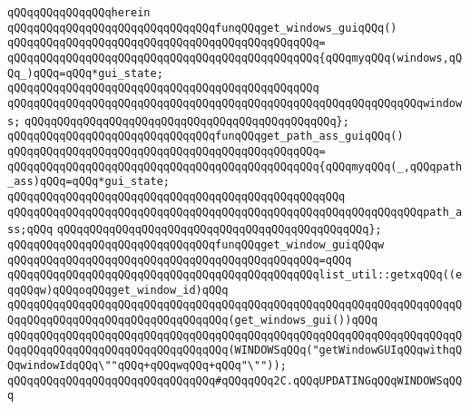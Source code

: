 \verb|qQQqqQQqqQQqqQQqherein|\newline
\newline
\verb|qQQqqQQqqQQqqQQqqQQqqQQqqQQqqQQqfunqQQqget_windows_guiqQQq()|\newline
\verb|qQQqqQQqqQQqqQQqqQQqqQQqqQQqqQQqqQQqqQQqqQQqqQQq=|\newline
\verb|qQQqqQQqqQQqqQQqqQQqqQQqqQQqqQQqqQQqqQQqqQQqqQQq{qQQqmyqQQq(windows,qQQq_)qQQq=qQQq*gui_state;|\newline
\verb|qQQqqQQqqQQqqQQqqQQqqQQqqQQqqQQqqQQqqQQqqQQqqQQq|\newline
\verb|qQQqqQQqqQQqqQQqqQQqqQQqqQQqqQQqqQQqqQQqqQQqqQQqqQQqqQQqqQQqqQQqwindows;|\newline
\verb|qQQqqQQqqQQqqQQqqQQqqQQqqQQqqQQqqQQqqQQqqQQqqQQq};|\newline
\newline
\verb|qQQqqQQqqQQqqQQqqQQqqQQqqQQqqQQqfunqQQqget_path_ass_guiqQQq()|\newline
\verb|qQQqqQQqqQQqqQQqqQQqqQQqqQQqqQQqqQQqqQQqqQQqqQQq=|\newline
\verb|qQQqqQQqqQQqqQQqqQQqqQQqqQQqqQQqqQQqqQQqqQQqqQQq{qQQqmyqQQq(_,qQQqpath_ass)qQQq=qQQq*gui_state;|\newline
\verb|qQQqqQQqqQQqqQQqqQQqqQQqqQQqqQQqqQQqqQQqqQQqqQQqqQQq|\newline
\verb|qQQqqQQqqQQqqQQqqQQqqQQqqQQqqQQqqQQqqQQqqQQqqQQqqQQqqQQqqQQqqQQqpath_ass;qQQq|\newline
\verb|qQQqqQQqqQQqqQQqqQQqqQQqqQQqqQQqqQQqqQQqqQQqqQQq};|\newline
\newline
\verb|qQQqqQQqqQQqqQQqqQQqqQQqqQQqqQQqfunqQQqget_window_guiqQQqw|\newline
\verb|qQQqqQQqqQQqqQQqqQQqqQQqqQQqqQQqqQQqqQQqqQQqqQQq=qQQq|\newline
\verb|qQQqqQQqqQQqqQQqqQQqqQQqqQQqqQQqqQQqqQQqqQQqqQQqlist_util::getxqQQq((eqqQQqw)qQQqoqQQqget_window_id)qQQq|\newline
\verb|qQQqqQQqqQQqqQQqqQQqqQQqqQQqqQQqqQQqqQQqqQQqqQQqqQQqqQQqqQQqqQQqqQQqqQQqqQQqqQQqqQQqqQQqqQQqqQQqqQQqqQQq(get_windows_gui())qQQq|\newline
\verb|qQQqqQQqqQQqqQQqqQQqqQQqqQQqqQQqqQQqqQQqqQQqqQQqqQQqqQQqqQQqqQQqqQQqqQQqqQQqqQQqqQQqqQQqqQQqqQQqqQQqqQQq(WINDOWSqQQq("getWindowGUIqQQqwithqQQqwindowIdqQQq\""qQQq+qQQqwqQQq+qQQq"\""));|\newline
\newline
\newline
\verb|qQQqqQQqqQQqqQQqqQQqqQQqqQQqqQQq#qQQqqQQq2C.qQQqUPDATINGqQQqWINDOWSqQQq|\newline

